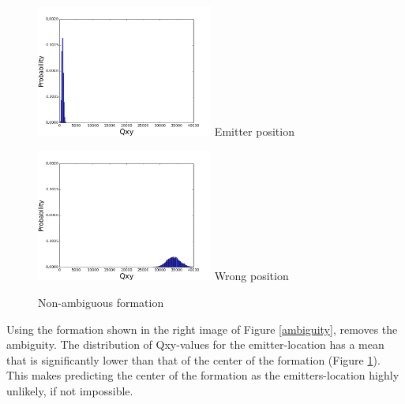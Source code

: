 \documentclass[10pt,a4paper]{book}
\begin{document}
\begin{figure}[H]
\centering
\begin{minipage}{55mm}
  \centering
  \includegraphics[width=58mm]{Non-ambiguous_-_Emitter_position.png}
  Emitter position
\end{minipage}%
\begin{minipage}{55mm}
  \centering
  \includegraphics[width=58mm]{Non-ambiguous_-_Wrong_position.png}
  Wrong position
\end{minipage}
\caption{Non-ambiguous formation}
\label{nonambiguousform}
\end{figure}


Using the formation shown in the right image of Figure \ref{ambiguity}, removes the ambiguity. The distribution of Qxy-values for the emitter-location has a mean that is significantly lower than that of the center of the formation (Figure \ref{nonambiguousform}). This makes predicting the center of the formation as the emitters-location highly unlikely, if not impossible. 
\end{document}
